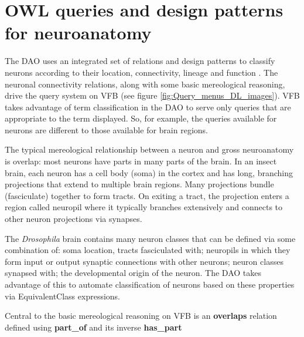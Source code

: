 \documentclass[runningheads,a4paper]{llncs}
\begin{document}




\section{OWL queries and design patterns for neuroanatomy}

The DAO uses an integrated set of relations and design patterns to
classify neurons according to their location, connectivity, lineage
and function \cite{pmid22180411,pmid22402613}.  The neuronal
connectivity relations, along with some basic mereological reasoning,
drive the query system on VFB (see figure
\ref{fig:Query_menus_DL_images}). VFB takes advantage of term
classification in the DAO to serve only queries that are
appropriate to the term displayed. So, for example, the queries
available for neurons are different to those available for brain regions.

The typical mereological relationship between a neuron and gross
neuroanatomy is overlap:  most neurons have parts in many
parts of the brain.  In an insect brain, each neuron has a cell body
(soma) in the cortex and has long, branching projections that extend
to multiple brain regions.  Many projections bundle (fasciculate)
together to form tracts.  On exiting a tract, the projection enters a
region called neuropil where it typically branches extensively and
connects to other neuron projections via synapses.

The \textit{Drosophila} brain contains many neuron classes that can be
defined via some combination of: soma location, tracts fasciculated
with; neuropils in which they form input or output synaptic
connections with other neurons; neuron classes synapsed with; the
developmental origin of the neuron.  The DAO takes advantage of this
to automate classification of neurons based on these properties via
EquivalentClass expressions.

Central to the basic mereological reasoning on VFB is an
\textbf{overlaps} relation defined using \textbf{part\_of} and its
inverse \textbf{has\_part}
\end{document}
